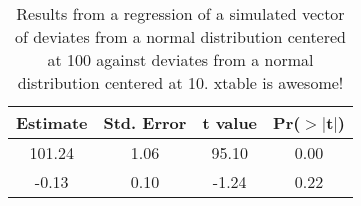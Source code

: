 \begin{table}[ht]
\centering
\caption{Results from a regression of a simulated vector of deviates from a normal distribution centered at 100 against deviates from a normal distribution centered at 10. xtable is awesome!} 
\label{table:lm_results}
\begin{tabular}{cccc}
  \hline
Estimate & Std. Error & t value & Pr($>$$|$t$|$) \\ 
  \hline
101.24 & 1.06 & 95.10 & 0.00 \\ 
  -0.13 & 0.10 & -1.24 & 0.22 \\ 
   \hline
\end{tabular}
\end{table}

